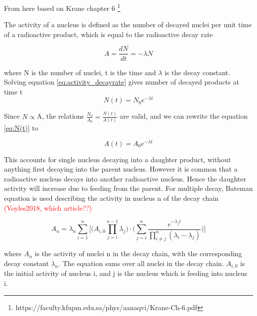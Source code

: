 From here based on Krane chapter 6 \footnote{https://faculty.kfupm.edu.sa/phys/aanaqvi/Krane-Ch-6.pdf}

The activity of a nucleus is defined as the number of decayed nuclei per unit time of a radioactive product, which is equal to the radioactive decay rate 

\begin{equation} \label{eq:activity_decayrate}
   A =  \frac{dN}{dt}=-\lambda N
\end{equation}

where N is the number of nuclei, t is the time and $\lambda$ is the decay constant. Solving equation \ref{eq:activity_decayrate} gives number of decayed products at time t
\begin{equation} \label{eq:N(t)}
    N(t) = N_0 e^{-\lambda t}
\end{equation}

\noindent 
Since $N\propto$A, the relations $\frac{N_0}{A_0}=\frac{N(t)}{A(t)}$ are valid, and we can rewrite the equation \ref{eq:N(t)} to

\begin{equation} \label{eq:activity_decaylaw}
    A(t) = A_0 e^{-\lambda t}
\end{equation}


This accounts for single nucleus decaying into a daughter product, without anything first decaying into the parent nucleus. However it is common that a radioactive nucleus decays into another radioactive nucleus. Hence the daughter activity will increase due to feeding from the parent.
For multiple decay, Bateman equation is used describing the activity in nucleus n of the decay chain \textcolor{red}{(Voyles2018, which article??)}

\begin{equation} \label{eq:ndecay_chains}
    A_n = \lambda_n \sum_{i=1}^n \Big[ \Big( A_{i,0}\prod^{n-1}_{j=i}\lambda_j \Big)\cdot \Big( \sum_{j=i}^n \frac{e^{-\lambda_j t}}{\prod_{i\neq j}^n (\lambda_i - \lambda_j)} \Big) \Big]
\end{equation}

where $A_n$ is the activity of nuclei n in the decay chain, with the corresponding decay constant $\lambda_n$. The equation sums over all nuclei in the decay chain. $A_{i,0}$ is the initial activity of nucleus i, and j is the nucleus which is feeding into nucleus i. 

